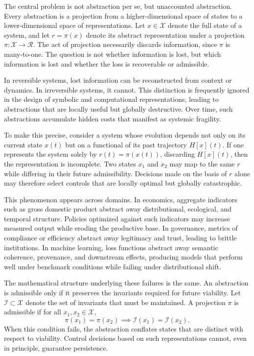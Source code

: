 \documentclass[12pt,oneside]{book}
\begin{document}
The central problem is not abstraction per se, but unaccounted abstraction. Every abstraction is a projection from a higher-dimensional space of states to a lower-dimensional space of representations. Let \(x \in \mathcal{X}\) denote the full state of a system, and let \(r = \pi(x)\) denote its abstract representation under a projection \(\pi : \mathcal{X} \to \mathcal{R}\). The act of projection necessarily discards information, since \(\pi\) is many-to-one. The question is not whether information is lost, but which information is lost and whether the loss is recoverable or admissible.

In reversible systems, lost information can be reconstructed from context or dynamics. In irreversible systems, it cannot. This distinction is frequently ignored in the design of symbolic and computational representations, leading to abstractions that are locally useful but globally destructive. Over time, such abstractions accumulate hidden costs that manifest as systemic fragility.

To make this precise, consider a system whose evolution depends not only on its current state \(x(t)\) but on a functional of its past trajectory \(H[x](t)\). If one represents the system solely by \(r(t) = \pi(x(t))\), discarding \(H[x](t)\), then the representation is incomplete. Two states \(x_1\) and \(x_2\) may map to the same \(r\) while differing in their future admissibility. Decisions made on the basis of \(r\) alone may therefore select controls that are locally optimal but globally catastrophic.

This phenomenon appears across domains. In economics, aggregate indicators such as gross domestic product abstract away distributional, ecological, and temporal structure. Policies optimized against such indicators may increase measured output while eroding the productive base. In governance, metrics of compliance or efficiency abstract away legitimacy and trust, leading to brittle institutions. In machine learning, loss functions abstract away semantic coherence, provenance, and downstream effects, producing models that perform well under benchmark conditions while failing under distributional shift.

The mathematical structure underlying these failures is the same. An abstraction is admissible only if it preserves the invariants required for future viability. Let \(\mathcal{I} \subset \mathcal{X}\) denote the set of invariants that must be maintained. A projection \(\pi\) is admissible if for all \(x_1, x_2 \in \mathcal{X}\),
\[
\pi(x_1) = \pi(x_2) \implies \mathcal{I}(x_1) = \mathcal{I}(x_2).
\]
When this condition fails, the abstraction conflates states that are distinct with respect to viability. Control decisions based on such representations cannot, even in principle, guarantee persistence.
\end{document}
